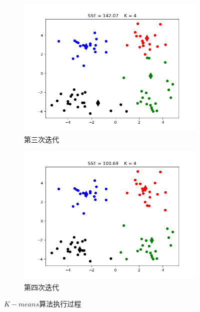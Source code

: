 \documentclass[bachelor,adobefonts]{jnuthesis}
\begin{document}
\begin{figure}[h!]
\begin{subfigure}[b]{0.4\linewidth}
    \includegraphics[width=\linewidth]{W4-3.png}
    \caption{第三次迭代}
  \end{subfigure}
  \begin{subfigure}[b]{0.4\linewidth}
    \includegraphics[width=\linewidth]{W4-4.png}
    \caption{第四次迭代}
  \end{subfigure}
  \caption{$K-means$算法执行过程}
\end{figure}
\end{document}
